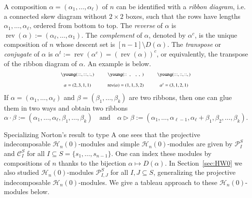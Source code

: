 \documentclass{amsart}
\newtheorem*{Young's Rule}{Young's Rule}
\theoremstyle{definition}
\theoremstyle{remark}
\numberwithin{equation}{section}
\begin{document}
A composition $\alpha=(\alpha_1,\ldots,\alpha_\ell)$ of $n$ can be identified with a \emph{ribbon diagram}, i.e. a connected skew diagram without $2\times2$ boxes, such that the rows have lengths $\alpha_1,\ldots,\alpha_\ell$, ordered from bottom to top. The \emph{reverse} of $\alpha$ is ${\operatorname{rev}}(\alpha):=(\alpha_\ell,\ldots,\alpha_1)$. The \emph{complement} of $\alpha$, denoted by $\alpha^c$, is the unique composition of $n$ whose descent set is $[n-1]\setminus D(\alpha)$. The \emph{transpose} or \emph{conjugate} of $\alpha$ is $\alpha^t := {\operatorname{rev}}(\alpha^c) = ({\operatorname{rev}}(\alpha))^c$, or equivalently, the transpose of the ribbon diagram of $\alpha$. An example is below.
\[\scriptsize
\begin{matrix} 
\young(:::\hfill,:::\hfill,:\hfill\hfill\hfill,\hfill\hfill) & &
\young(::\hfill\hfill,\hfill\hfill\hfill,\hfill,\hfill) & &
\young(:::\hfill,::\hfill\hfill,::\hfill,\hfill\hfill\hfill) \\ \\
\alpha=(2,3,1,1) & & {\operatorname{rev}}(\alpha)=(1,1,3,2) & & \alpha^t=(3,1,2,1)
\end{matrix}\]
If $\alpha=(\alpha_1,\ldots,\alpha_\ell)$ and $\beta=(\beta_1,\ldots,\beta_k)$ are two ribbons, then one can glue them in two ways and obtain two ribbons
\[ \alpha\cdot\beta:=(\alpha_1,\ldots,\alpha_\ell,\beta_1,\ldots,\beta_k)
\quad\text{and}\quad 
\alpha\rhd\beta:=(\alpha_1,\ldots,\alpha_{\ell-1},\alpha_\ell+\beta_1,\beta_2,\ldots,\beta_k). \]

Specializing Norton's result to type A one sees that the projective indecomposable ${\mathcal{H}}_n(0)$-modules and simple ${\mathcal{H}}_n(0)$-modules are given by ${\mathcal{P}}_I^S$ and ${\mathcal{C}}_I^S$ for all $I\subseteq S=\{s_1,\ldots,s_{n-1}\}$. One can index these modules by compositions of $n$ thanks to the bijection $\alpha\mapsto D(\alpha)$. In Section~\ref{sec:HW0} we also studied ${\mathcal{H}}_n(0)$-modules ${\mathcal{P}_{I,J}^S}$ for all  $I,J\subseteq S$, generalizing the projective indecomposable ${\mathcal{H}}_n(0)$-modules. We give a tableau approach to these ${\mathcal{H}}_n(0)$-modules below.
\end{document}
